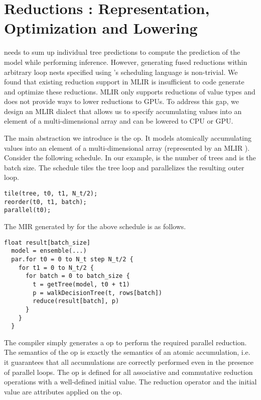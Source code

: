 \section{Reductions : Representation, Optimization and Lowering}
\label{sec:reduction}
\Treebeard{} needs to sum up individual tree predictions to compute 
the prediction of the model while performing inference. However,
generating fused reductions within arbitrary loop nests specified 
using \Treebeard{}'s scheduling language is non-trivial. We found 
that existing reduction support in MLIR is insufficient to code
generate and optimize these reductions. MLIR only supports reductions
of value types and does not provide ways to lower reductions to GPUs. 
To address this gap, we design an MLIR dialect that allows us to
specify accumulating values into an element of a multi-dimensional array
and can be lowered to CPU or GPU. 

The main abstraction we introduce is the  op. It models 
atomically accumulating values into an element of a 
multi-dimensional array (represented by an MLIR ).
Consider the following \Treebeard{} schedule.
In our example,  is the number of trees 
and  is the batch size. The schedule tiles the 
tree loop and parallelizes the resulting outer loop.
\begin{lstlisting}[style=c++]
tile(tree, t0, t1, N_t/2);
reorder(t0, t1, batch);
parallel(t0);
\end{lstlisting}

The MIR generated by \Treebeard{} for the above schedule is as follows. 
\begin{lstlisting}[style=c++]
  float result[batch_size]
  model = ensemble(...) 
  par.for t0 = 0 to N_t step N_t/2 {
    for t1 = 0 to N_t/2 {
      for batch = 0 to batch_size {
        t = getTree(model, t0 + t1) 
        p = walkDecisionTree(t, rows[batch])
        reduce(result[batch], p)
      }
    }
  }  
\end{lstlisting}

The compiler simply generates a  op to perform
the required parallel reduction. 
The semantics of the  op is exactly the semantics of 
an atomic accumulation, i.e. it guarantees that all accumulations 
are correctly performed even in the presence of parallel loops. 
The  op is defined for all associative and commutative
reduction operations with a well-defined initial value. The 
reduction operator and the initial value are attributes applied
on the  op. 

